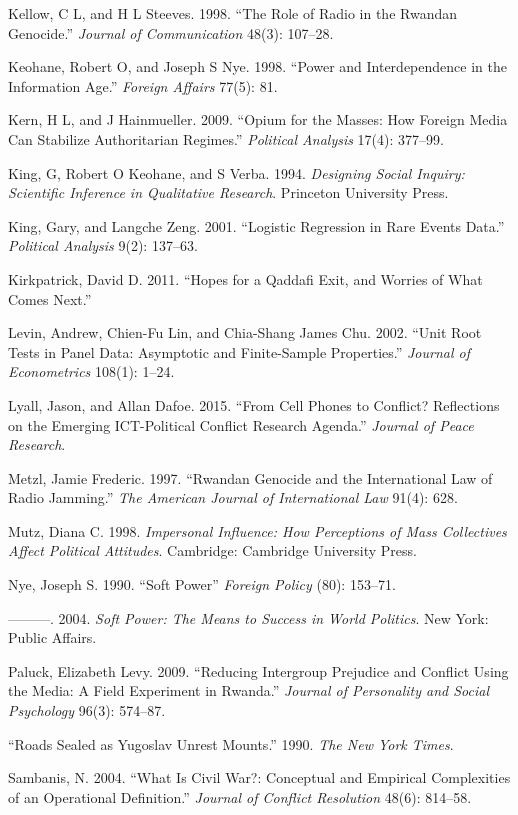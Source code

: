 \documentclass[11pt,article,oneside]{memoir}
\begin{document}
Kellow, C L, and H L Steeves. 1998. ``The Role of Radio in the Rwandan
Genocide.'' \emph{Journal of Communication} 48(3): 107--28.

Keohane, Robert O, and Joseph S Nye. 1998. ``Power and Interdependence
in the Information Age.'' \emph{Foreign Affairs} 77(5): 81.

Kern, H L, and J Hainmueller. 2009. ``Opium for the Masses: How Foreign
Media Can Stabilize Authoritarian Regimes.'' \emph{Political Analysis}
17(4): 377--99.

King, G, Robert O Keohane, and S Verba. 1994. \emph{Designing Social
Inquiry: Scientific Inference in Qualitative Research}. Princeton
University Press.

King, Gary, and Langche Zeng. 2001. ``Logistic Regression in Rare Events
Data.'' \emph{Political Analysis} 9(2): 137--63.

Kirkpatrick, David D. 2011. ``Hopes for a Qaddafi Exit, and Worries of
What Comes Next.''

Levin, Andrew, Chien-Fu Lin, and Chia-Shang James Chu. 2002. ``Unit Root
Tests in Panel Data: Asymptotic and Finite-Sample Properties.''
\emph{Journal of Econometrics} 108(1): 1--24.

Lyall, Jason, and Allan Dafoe. 2015. ``From Cell Phones to Conflict?
Reflections on the Emerging ICT-Political Conflict Research Agenda.''
\emph{Journal of Peace Research}.

Metzl, Jamie Frederic. 1997. ``Rwandan Genocide and the International
Law of Radio Jamming.'' \emph{The American Journal of International Law}
91(4): 628.

Mutz, Diana C. 1998. \emph{Impersonal Influence: How Perceptions of Mass
Collectives Affect Political Attitudes}. Cambridge: Cambridge University
Press.

Nye, Joseph S. 1990. ``Soft Power'' \emph{Foreign Policy} (80): 153--71.

---------. 2004. \emph{Soft Power: The Means to Success in World
Politics}. New York: Public Affairs.

Paluck, Elizabeth Levy. 2009. ``Reducing Intergroup Prejudice and
Conflict Using the Media: A Field Experiment in Rwanda.'' \emph{Journal
of Personality and Social Psychology} 96(3): 574--87.

``Roads Sealed as Yugoslav Unrest Mounts.'' 1990. \emph{The New York
Times}.

Sambanis, N. 2004. ``What Is Civil War?: Conceptual and Empirical
Complexities of an Operational Definition.'' \emph{Journal of Conflict
Resolution} 48(6): 814--58.
\end{document}
